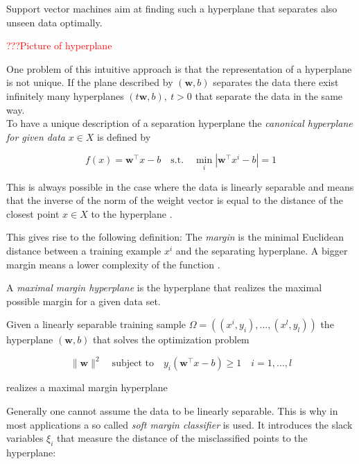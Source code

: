 Support vector machines aim at finding such a hyperplane that separates also unseen data optimally.

\textcolor{red}{???Picture of hyperplane}

One problem of this intuitive approach is that the representation of a hyperplane is not unique. If the plane described by \((\bm{w},b)\) separates the data there exist infinitely many hyperplanes \((t\bm{w},b), ~ t>0\) that separate the data in the same way. \\
To have a unique description of a separation hyperplane the \emph{canonical hyperplane for given data} \(x \in X\) is defined by 

\[ f(x) = \bm{w}^{\top} x - b  \quad \text{s.t.} \quad \min_i |\bm{w}^{\top}x^i-b| = 1\] 

This is always possible in the case where the data is  linearly separable and means that the inverse of the norm of the weight vector is equal to the distance of the closest point \(x \in X \) to  the hyperplane \cite{Kunapuli2008}.



This gives rise to the following definition:
The \emph{margin} is the minimal Euclidean distance between a training example \(x^i\) and the separating hyperplane.
A bigger margin means a lower complexity of the function \cite{Cristianini2000}. 

A \emph{maximal margin hyperplane} is the hyperplane that realizes the maximal possible margin for a given data set.

\begin{theorem}
Given a linearly separable training sample \(\Omega = ((x^i,y_i),...,(x^l,y_l))\) the hyperplane \((\bm{w},b)\) that solves the optimization problem

\[\|\bm{w}\|^2 \quad \text{subject to} \quad y_i(\bm{w}^{\top}x-b)\geq 1 \quad i = 1,...,l \]

realizes a maximal margin hyperplane  
\end{theorem}

Generally one cannot assume the data to be linearly separable. This is why in most applications a so called \emph{soft margin classifier} is used. It introduces the slack variables \(\xi_i\) that measure the distance of the misclassified points to the hyperplane:


